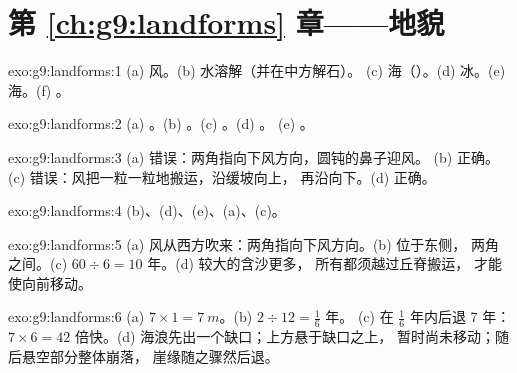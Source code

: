 \section*{第 \ref{ch:g9:landforms} 章——地貌}

\begin{solution}{exo:g9:landforms:1}
(a) 风。(b) 水溶解（并在中方解石）。
(c) 海（）。(d) 冰。(e) 海。(f) 。
\end{solution}

\begin{solution}{exo:g9:landforms:2}
(a) 。(b) 。(c) 。(d) 。
(e) 。
\end{solution}

\begin{solution}{exo:g9:landforms:3}
(a) 错误：两角指向下风方向，圆钝的鼻子迎风。
(b) 正确。(c) 错误：风把一粒一粒地搬运，沿缓坡向上，
再沿向下。(d) 正确。
\end{solution}

\begin{solution}{exo:g9:landforms:4}
(b)、(d)、(e)、(a)、(c)。
\end{solution}

\begin{solution}{exo:g9:landforms:5}
(a) 风从西方吹来：两角指向下风方向。(b) 位于东侧，
两角之间。(c) $60 \div 6 = 10$ 年。(d) 较大的含沙更多，
所有都须越过丘脊搬运，
才能使向前移动。
\end{solution}

\begin{solution}{exo:g9:landforms:6}
(a) $7 \times 1 = \qty{7}{m}$。(b) $2 \div 12 = \frac{1}{6}$ 年。
(c) 在 $\frac{1}{6}$ 年内后退 7 年：$7 \times 6 = 42$
倍快。(d) 海浪先出一个缺口；上方悬于缺口之上，
暂时尚未移动；随后悬空部分整体崩落，
崖缘随之骤然后退。
\end{solution}

